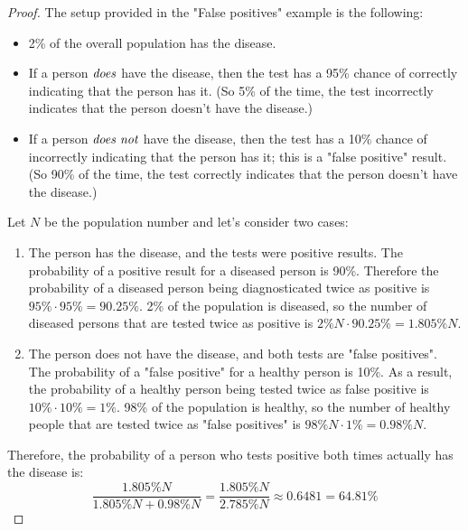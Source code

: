 \begin{proof}
    The setup provided in the "False positives" example is the following:
    \begin{itemize}
        \item 2\% of the overall population has the disease.

        \item If a person $\emph{does}$ have the disease, then the test has a 95\% chance of correctly
            indicating that the person has it. (So 5\% of the time, the test incorrectly indicates
            that the person doesn't have the disease.)

        \item If a person $\emph{does not}$ have the disease, then the test has a 10\% chance of
            incorrectly indicating that the person has it; this is a "false positive" result.
            (So 90\% of the time, the test correctly indicates that the person doesn't have the 
            disease.)
    \end{itemize}

    Let $N$ be the population number and let's consider two cases:
    \begin{enumerate}
        \item The person has the disease, and the tests were positive results.
            The probability of a positive result for a diseased person is 90\%.
            Therefore the probability of a diseased person being diagnosticated twice
            as positive is $95\% \cdot 95\% = 90.25\%$. 2\% of the population is diseased,
            so the number of diseased persons that are tested twice as positive is 
            $2\%N \cdot 90.25\% = 1.805\%N$.

        \item The person does not have the disease, and both tests are "false positives".
            The probability of a "false positive" for a healthy person is 10\%.
            As a result, the probability of a healthy person being tested twice as false positive
            is $10\% \cdot 10\% = 1\%$. 98\% of the population is healthy, so the number
            of healthy people that are tested twice as "false positives" is 
            $98\%N \cdot 1\% = 0.98\%N$.
    \end{enumerate}

    Therefore, the probability of a person who tests positive both times actually has the disease
    is:
    \[
        \frac{1.805\%N}{1.805\%N + 0.98\%N} = \frac{1.805\%N}{2.785\%N} \approx 0.6481 = 64.81\%
    \]
\end{proof}
